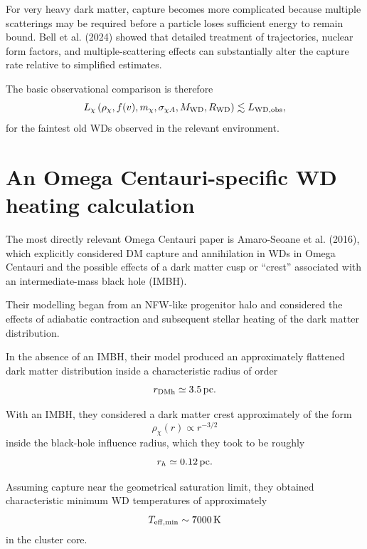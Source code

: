 \documentclass[11pt,a4paper]{article}
\begin{document}
For very heavy dark matter, capture becomes more complicated because multiple scatterings may be required before a particle loses sufficient energy to remain bound. Bell et al. (2024) showed that detailed treatment of trajectories, nuclear form factors, and multiple-scattering effects can substantially alter the capture rate relative to simplified estimates.

The basic observational comparison is therefore
\begin{equation}
L_\chi
\left(
\rho_\chi,
f(v),
m_\chi,
\sigma_{\chi A},
M_{\rm WD},
R_{\rm WD}
\right)
\lesssim
L_{\rm WD,obs},
\end{equation}
for the faintest old WDs observed in the relevant environment.


\section{An Omega Centauri-specific WD heating calculation}

The most directly relevant Omega Centauri paper is Amaro-Seoane et al. (2016), which explicitly considered DM capture and annihilation in WDs in Omega Centauri and the possible effects of a dark matter cusp or ``crest'' associated with an intermediate-mass black hole (IMBH).

Their modelling began from an NFW-like progenitor halo and considered the effects of adiabatic contraction and subsequent stellar heating of the dark matter distribution.

In the absence of an IMBH, their model produced an approximately flattened dark matter distribution inside a characteristic radius of order
\begin{equation}
r_{\rm DMh} \simeq 3.5\,{\rm pc}.
\end{equation}

With an IMBH, they considered a dark matter crest approximately of the form
\begin{equation}
\rho_\chi(r) \propto r^{-3/2}
\end{equation}
inside the black-hole influence radius, which they took to be roughly
\begin{equation}
r_h \simeq 0.12\,{\rm pc}.
\end{equation}

Assuming capture near the geometrical saturation limit, they obtained characteristic minimum WD temperatures of approximately
\begin{equation}
T_{\rm eff,min}\sim 7000\,{\rm K}
\end{equation}
in the cluster core.
\end{document}
